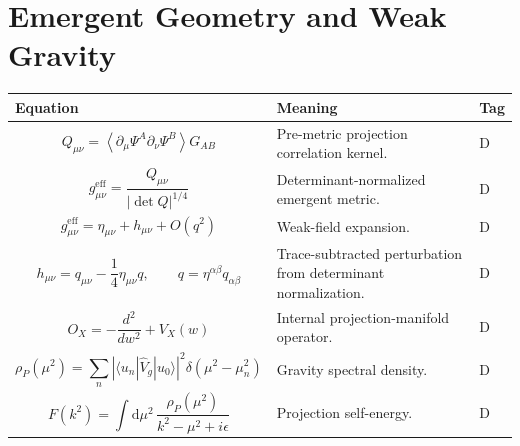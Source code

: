 \documentclass[11pt]{article}
\newcommand{\eff}{\mathrm{eff}}
\newcommand{\dd}{\mathrm{d}}
\begin{document}
\section{Emergent Geometry and Weak Gravity}
\begin{longtable}{>{\raggedright\arraybackslash}p{} >{\raggedright\arraybackslash}p{} >{\centering\arraybackslash}p{}}
\toprule
\textbf{Equation} & \textbf{Meaning} & \textbf{Tag} \\
\midrule
\endhead

\begin{equation}
Q_{\mu\nu}=\left\langle\partial_\mu\Psi^A\partial_\nu\Psi^B\right\rangle G_{AB}
\end{equation}
& Pre-metric projection correlation kernel. & D \\

\begin{equation}
g_{\mu\nu}^{\eff}=\frac{Q_{\mu\nu}}{|\det Q|^{1/4}}
\end{equation}
& Determinant-normalized emergent metric. & D \\

\begin{equation}
g_{\mu\nu}^{\eff}=\eta_{\mu\nu}+h_{\mu\nu}+O(q^2)
\end{equation}
& Weak-field expansion. & D \\

\begin{equation}
h_{\mu\nu}
=
q_{\mu\nu}
-
\frac14\eta_{\mu\nu}q,
\qquad
q=\eta^{\alpha\beta}q_{\alpha\beta}
\end{equation}
& Trace-subtracted perturbation from determinant normalization. & D \\

\begin{equation}
O_X
=
-
\frac{d^2}{dw^2}
+
V_X(w)
\end{equation}
& Internal projection-manifold operator. & D \\

\begin{equation}
\rho_P(\mu^2)
=
\sum_n
\left|
\langle u_n|\hat V_g|u_0\rangle
\right|^2
\delta(\mu^2-\mu_n^2)
\end{equation}
& Gravity spectral density. & D \\

\begin{equation}
F(k^2)
=
\int \dd\mu^2\,\frac{\rho_P(\mu^2)}{k^2-\mu^2+i\epsilon}
\end{equation}
& Projection self-energy. & D \\


\end{longtable}
\end{document}

